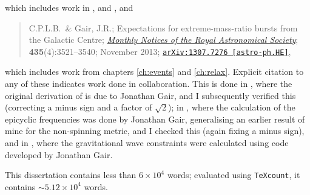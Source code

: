 which includes work in ,  and , and
\begin{quote}
C.P.L.B.\ \& Gair, J.R.; Expectations for extreme-mass-ratio bursts from the Galactic Centre; \href{http://dx.doi.org/10.1093/mnras/stt1543}{\it Monthly Notices of the Royal Astronomical Society}; {\bf 435}(4):3521--3540; November 2013; \href{http://arxiv.org/abs/1307.7276}{\tt arXiv:1307.7276 [astro-ph.HE]},
\end{quote}
which includes work from chapters \ref{ch:events} and \ref{ch:relax}. Explicit citation to any of these indicates work done in collaboration. This is done in , where the original derivation of  is due to Jonathan Gair, and I subsequently verified this (correcting a minus sign and a factor of $\sqrt{2}$); in , where the calculation of the epicyclic frequencies was done by Jonathan Gair, generalising an earlier result of mine for the non-spinning metric, and I checked this (again fixing a minus sign), and in , where the gravitational wave constraints were calculated using code developed by Jonathan Gair.

This dissertation contains less than $6 \times 10^4$ words; evaluated using \texttt{TeXcount}, it contains $\sim 5.12 \times 10^4$ words.
